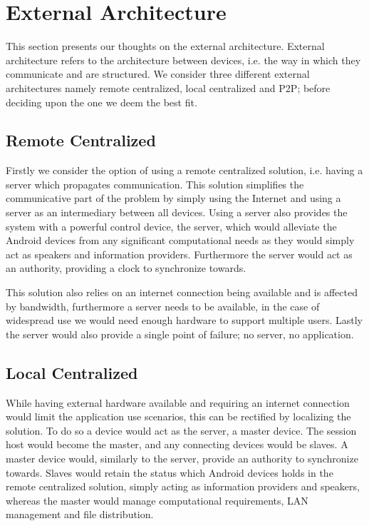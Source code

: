 \section{External Architecture}
This section presents our thoughts on the external architecture.
External architecture refers to the architecture between devices, i.e. the way in which they communicate and are structured.
We consider three different external architectures namely remote centralized, local centralized and \ac{P2P}; before deciding upon the one we deem the best fit.

\subsection{Remote Centralized}
Firstly we consider the option of using a remote centralized solution, i.e. having a server which propagates communication.
This solution simplifies the communicative part of the problem by simply using the Internet and using a server as an intermediary between all devices.
Using a server also provides the system with a powerful control device, the server, which would alleviate the Android devices from any significant computational needs as they would simply act as speakers and information providers.
Furthermore the server would act as an authority, providing a clock to synchronize towards.

This solution also relies on an internet connection being available and is affected by bandwidth, furthermore a server needs to be available, in the case of widespread use we would need enough hardware to support multiple users.
Lastly the server would also provide a single point of failure; no server, no application.

\subsection{Local Centralized}
While having external hardware available and requiring an internet connection would limit the application use scenarios, this can be rectified by localizing the solution.
To do so a device would act as the server, a master device.
The session host would become the master, and any connecting devices would be slaves.
A master device would, similarly to the server, provide an authority to synchronize towards.
Slaves would retain the status which Android devices holds in the remote centralized solution, simply acting as information providers and speakers, whereas the master would manage computational requirements, LAN management and file distribution.


